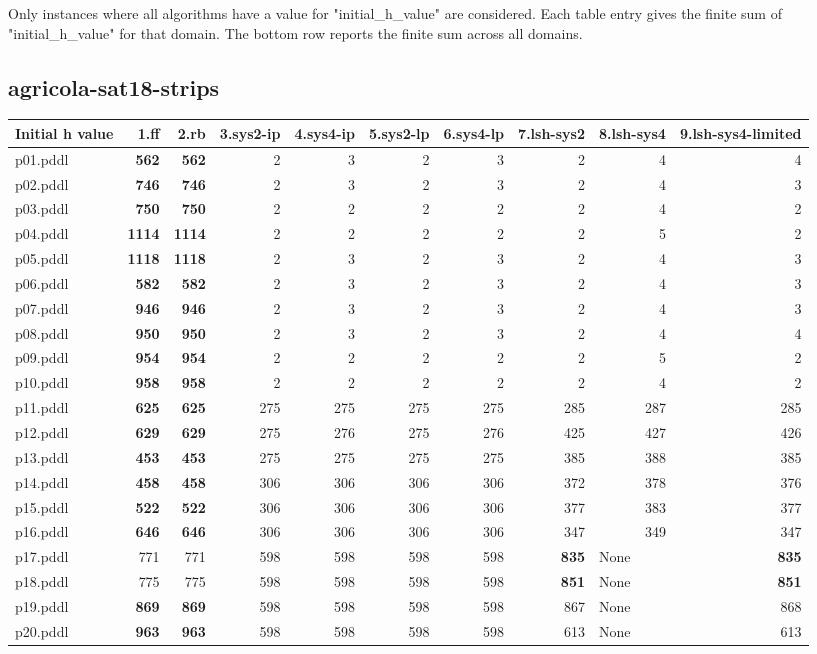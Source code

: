\documentclass{article}
\begin{document}
Only instances where all algorithms have a value for "initial\_h\_value" are considered. Each table entry gives the finite sum of "initial\_h\_value" for that domain. The bottom row reports the finite sum across all domains.

\hypertarget{initial_h_value-agricola-sat18-strips}{}
\subsection*{agricola-sat18-strips}

\begin{tabular}{@{}lrrrrrrrrr@{}}
Initial h value & 1.ff & 2.rb & 3.sys2-ip & 4.sys4-ip & 5.sys2-lp & 6.sys4-lp & 7.lsh-sys2 & 8.lsh-sys4 & 9.lsh-sys4-limited \\
\midrule
p01.pddl & \textbf{562} & \textbf{562} & 2 & 3 & 2 & 3 & 2 & 4 & 4 \\
p02.pddl & \textbf{746} & \textbf{746} & 2 & 3 & 2 & 3 & 2 & 4 & 3 \\
p03.pddl & \textbf{750} & \textbf{750} & 2 & 2 & 2 & 2 & 2 & 4 & 2 \\
p04.pddl & \textbf{1114} & \textbf{1114} & 2 & 2 & 2 & 2 & 2 & 5 & 2 \\
p05.pddl & \textbf{1118} & \textbf{1118} & 2 & 3 & 2 & 3 & 2 & 4 & 3 \\
p06.pddl & \textbf{582} & \textbf{582} & 2 & 3 & 2 & 3 & 2 & 4 & 3 \\
p07.pddl & \textbf{946} & \textbf{946} & 2 & 3 & 2 & 3 & 2 & 4 & 3 \\
p08.pddl & \textbf{950} & \textbf{950} & 2 & 3 & 2 & 3 & 2 & 4 & 4 \\
p09.pddl & \textbf{954} & \textbf{954} & 2 & 2 & 2 & 2 & 2 & 5 & 2 \\
p10.pddl & \textbf{958} & \textbf{958} & 2 & 2 & 2 & 2 & 2 & 4 & 2 \\
p11.pddl & \textbf{625} & \textbf{625} & 275 & 275 & 275 & 275 & 285 & 287 & 285 \\
p12.pddl & \textbf{629} & \textbf{629} & 275 & 276 & 275 & 276 & 425 & 427 & 426 \\
p13.pddl & \textbf{453} & \textbf{453} & 275 & 275 & 275 & 275 & 385 & 388 & 385 \\
p14.pddl & \textbf{458} & \textbf{458} & 306 & 306 & 306 & 306 & 372 & 378 & 376 \\
p15.pddl & \textbf{522} & \textbf{522} & 306 & 306 & 306 & 306 & 377 & 383 & 377 \\
p16.pddl & \textbf{646} & \textbf{646} & 306 & 306 & 306 & 306 & 347 & 349 & 347 \\
p17.pddl & 771 & 771 & 598 & 598 & 598 & 598 & \textbf{835} & \multicolumn{1}{|l|}{None} & \textbf{835} \\
p18.pddl & 775 & 775 & 598 & 598 & 598 & 598 & \textbf{851} & \multicolumn{1}{|l|}{None} & \textbf{851} \\
p19.pddl & \textbf{869} & \textbf{869} & 598 & 598 & 598 & 598 & 867 & \multicolumn{1}{|l|}{None} & 868 \\
p20.pddl & \textbf{963} & \textbf{963} & 598 & 598 & 598 & 598 & 613 & \multicolumn{1}{|l|}{None} & 613 \\
\end{tabular}
\end{document}
